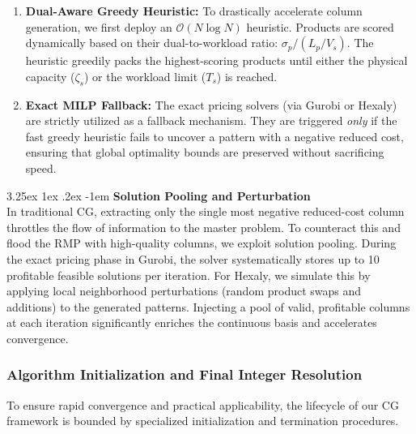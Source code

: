\documentclass[preprint,review,11pt,authoryear]{elsarticle}
\makeatletter
\renewcommand\paragraph{\@startsection{paragraph}{4}{\z@}
  {3.25ex \@plus1ex \@minus.2ex}
  {-1em}
  {\normalfont\normalsize\itshape}}
\makeatother
\begin{document}
\begin{enumerate}
    \item \textbf{Dual-Aware Greedy Heuristic:} To drastically accelerate column generation, we first deploy an $\mathcal{O}(N \log N)$ heuristic. Products are scored dynamically based on their dual-to-workload ratio: $\sigma_p / (L_p / V_s)$. The heuristic greedily packs the highest-scoring products until either the physical capacity ($\zeta_s$) or the workload limit ($T_s$) is reached. 
    \item \textbf{Exact MILP Fallback:} The exact pricing solvers (via Gurobi or Hexaly) are strictly utilized as a fallback mechanism. They are triggered \emph{only} if the fast greedy heuristic fails to uncover a pattern with a negative reduced cost, ensuring that global optimality bounds are preserved without sacrificing speed.
\end{enumerate}

\paragraph{ \textbf{Solution Pooling and Perturbation \\}}
In traditional CG, extracting only the single most negative reduced-cost column throttles the flow of information to the master problem. To counteract this and flood the RMP with high-quality columns, we exploit solution pooling. During the exact pricing phase in Gurobi, the solver systematically stores up to 10 profitable feasible solutions per iteration. For Hexaly, we simulate this by applying local neighborhood perturbations (random product swaps and additions) to the generated patterns. Injecting a pool of valid, profitable columns at each iteration significantly enriches the continuous basis and accelerates convergence.

\subsubsection{Algorithm Initialization and Final Integer Resolution}

To ensure rapid convergence and practical applicability, the lifecycle of our CG framework is bounded by specialized initialization and termination procedures.
\end{document}
